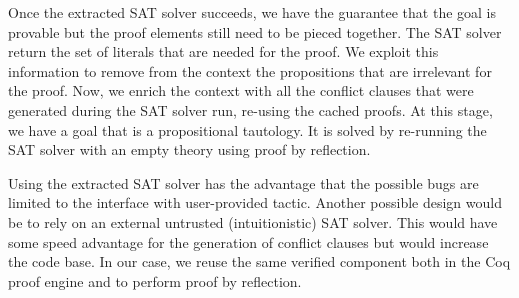 \documentclass[a4paper,UKenglish,cleveref, autoref, thm-restate]{lipics-v2019}
\begin{document}
Once the extracted SAT solver succeeds, we have the guarantee that the
goal is provable but the proof elements still need to be pieced together.
%
The SAT solver return the set of literals that are needed for the
proof.  We exploit this information to remove from the context the
propositions that are irrelevant for the proof. 
%
Now, we enrich the context with all the conflict clauses that were
generated during the SAT solver run, re-using the cached proofs.  At
this stage, we have a goal that is a propositional tautology.  It is
solved by re-running the SAT solver with an empty theory using proof by reflection.

Using the extracted SAT solver has the advantage that the possible
bugs are limited to the interface with user-provided tactic.
%
Another possible design would be to rely on an external untrusted
(intuitionistic) SAT solver. This would have some speed advantage for
the generation of conflict clauses but would increase the code
base. In our case, we reuse the same verified component both in the
Coq proof engine and to perform proof by reflection.



\end{document}

